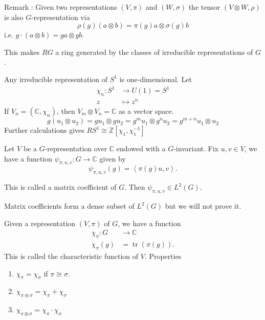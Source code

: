 \documentclass[11pt,a4paper]{scrarticle}
\theoremstyle{definition}
\theoremstyle{greenbox}
\newcommand{\Z}{\mathbb{Z}}
\newcommand{\C}{\mathbb{C}}
\begin{document}
    Remark : Given two representations $ (V, \pi) $ and $ (W, \sigma) $ the tensor $ (V \otimes W, \rho ) $ is also $ G $-representation via 
    \[ \rho(g)(a \otimes b) = \pi(g)a \otimes \sigma(g)b \]
    i.e. $ g \cdot(a \otimes b)  = g a \otimes g b$. 

    This makes $ RG $ a ring generated by the classes of irreducible representations of $ G $. 

    \begin{example}
        Any irreducible representation of $ S^{1} $ is one-dimensional. Let 
        \begin{align*}
            \chi_{n} : S^{1} & \to U(1) = S^{1} \\
            z & \mapsto z^{n}
        \end{align*}
        If $ V_{n} = (\C, \chi_{n}) $, then $ V_{m} \otimes V_{n} = \C $ as a vector space. 
        \[ g(u_{1} \otimes u_{2}) = g u_{1} \otimes g u_{2} =g^{m}u_{1} \otimes g^{n}u_{2} = g^{m+n}u_{1} \otimes u_{2}\]
        Further calculations gives $ RS^{1} \cong \Z[\chi_{1}, \chi_{1}^{-1}] $
    \end{example}

    Let $ V $ be a $ G $-representation over $ \C $ endowed with a $ G $-invariant. Fix $ u,v \in V $, we have a function $ \psi_{\pi,u,v} : G \to \C $ given by 
    \[ \psi_{\pi,u,v}(g) = \left< \pi(g)u,v \right> .\]

    This is called a matrix coefficient of $ G $. Then $ \psi_{\pi,u,v} \in L^{2}(G) $. 
    \begin{remark}
        Matrix coefficients form a dense subset of $ L^{2}(G) $ but we will not prove it. 
    \end{remark}
    
    Given a representation $ (V, \pi) $ of $ G $, we have a function 
    \begin{align*}
        \chi_{\pi} : G & \to \C \\
        \chi_{\pi}(g) & = \operatorname{tr}(\pi(g)).
    \end{align*}
    This is called the characteristic function of $ V $. Properties \begin{enumerate}
        \item $ \chi_{\pi} = \chi_{\sigma} $ if $ \pi \cong \sigma $. 
        \item $ \chi_{\pi \oplus \sigma} = \chi_{\pi}+ \chi_{\sigma} $
        \item $ \chi_{\pi \otimes \sigma} = \chi_{\pi} \cdot \chi_{\sigma} $
    \end{enumerate}
\end{document}
